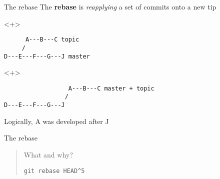 \documentclass[pdf]{beamer}
\begin{document}
\begin{frame}[fragile]{The rebase}
The \textbf{rebase} is \emph{reapplying} a set of commits onto a new tip

    \begin{block}{}<+>
        \begin{verbatim}
      A---B---C topic
     /
D---E---F---G---J master \end{verbatim}
    \end{block}
    \begin{block}{}<+>
    \begin{verbatim}
                  A---B---C master + topic
                 /
D---E---F---G---J \end{verbatim}

        Logically, A was developed after J
    \end{block}
\end{frame}

\begin{frame}[fragile]{The rebase}
    \begin{quote}
        What and why?

        \verb|git rebase HEAD^5|
    \end{quote}
\end{frame}
\end{document}
